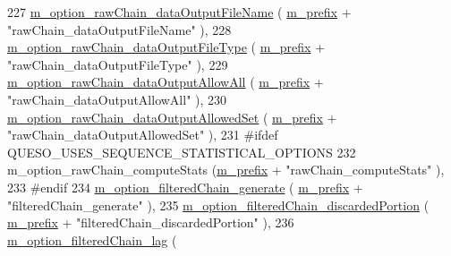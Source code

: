 \begin{DoxyCode}
227   \hyperlink{class_q_u_e_s_o_1_1_metropolis_hastings_s_g_options_a28d13976ef26bc450575528a37e1eeb6}{m\_option\_rawChain\_dataOutputFileName}               (
      \hyperlink{class_q_u_e_s_o_1_1_metropolis_hastings_s_g_options_a4f7c510aaa530336d24259e2a89f5d0b}{m\_prefix} + \textcolor{stringliteral}{"rawChain\_dataOutputFileName"}               ),
228   \hyperlink{class_q_u_e_s_o_1_1_metropolis_hastings_s_g_options_ae0bc37e9e5982b51f67e9788e4397cfa}{m\_option\_rawChain\_dataOutputFileType}               (
      \hyperlink{class_q_u_e_s_o_1_1_metropolis_hastings_s_g_options_a4f7c510aaa530336d24259e2a89f5d0b}{m\_prefix} + \textcolor{stringliteral}{"rawChain\_dataOutputFileType"}               ),
229   \hyperlink{class_q_u_e_s_o_1_1_metropolis_hastings_s_g_options_a336b749a8e06848243cf5bfbab2e43a6}{m\_option\_rawChain\_dataOutputAllowAll}               (
      \hyperlink{class_q_u_e_s_o_1_1_metropolis_hastings_s_g_options_a4f7c510aaa530336d24259e2a89f5d0b}{m\_prefix} + \textcolor{stringliteral}{"rawChain\_dataOutputAllowAll"}               ),
230   \hyperlink{class_q_u_e_s_o_1_1_metropolis_hastings_s_g_options_a53a51bf8aa24d9dbe4a9115453bd9e2b}{m\_option\_rawChain\_dataOutputAllowedSet}             (
      \hyperlink{class_q_u_e_s_o_1_1_metropolis_hastings_s_g_options_a4f7c510aaa530336d24259e2a89f5d0b}{m\_prefix} + \textcolor{stringliteral}{"rawChain\_dataOutputAllowedSet"}             ),
231 \textcolor{preprocessor}{#ifdef QUESO\_USES\_SEQUENCE\_STATISTICAL\_OPTIONS}
232 \textcolor{preprocessor}{}  m\_option\_rawChain\_computeStats                     (\hyperlink{class_q_u_e_s_o_1_1_metropolis_hastings_s_g_options_a4f7c510aaa530336d24259e2a89f5d0b}{m\_prefix} + \textcolor{stringliteral}{"rawChain\_computeStats"}           
                ),
233 \textcolor{preprocessor}{#endif}
234 \textcolor{preprocessor}{}  \hyperlink{class_q_u_e_s_o_1_1_metropolis_hastings_s_g_options_abb60803a2ba0d32816a1ac9ad67fe7fd}{m\_option\_filteredChain\_generate}                    (
      \hyperlink{class_q_u_e_s_o_1_1_metropolis_hastings_s_g_options_a4f7c510aaa530336d24259e2a89f5d0b}{m\_prefix} + \textcolor{stringliteral}{"filteredChain\_generate"}                    ),
235   \hyperlink{class_q_u_e_s_o_1_1_metropolis_hastings_s_g_options_a6bc7417585b95eb59cedece39b5d5361}{m\_option\_filteredChain\_discardedPortion}            (
      \hyperlink{class_q_u_e_s_o_1_1_metropolis_hastings_s_g_options_a4f7c510aaa530336d24259e2a89f5d0b}{m\_prefix} + \textcolor{stringliteral}{"filteredChain\_discardedPortion"}            ),
236   \hyperlink{class_q_u_e_s_o_1_1_metropolis_hastings_s_g_options_aa3e984a031cf626281bccd866e603865}{m\_option\_filteredChain\_lag}                         (

\end{DoxyCode}
